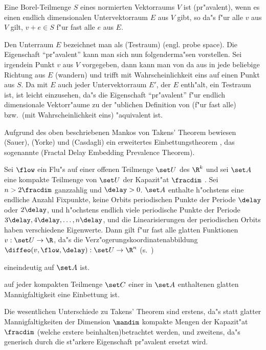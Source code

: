 \begin{definition}[Pr"avalent]
Eine Borel-Teilmenge $S$ eines normierten Vektorraums $V$ ist \begriff(pr"avalent), wenn
es einen endlich dimensionalen Untervektorraum $E$ aus $V$ gibt, so da"s f"ur alle $v$ aus
$V$ gilt, $v+e\in S$ f"ur fast alle $e$ aus $E$.
\end{definition}
Den Unterraum $E$ bezeichnet man als \begriff(Testraum) (engl. probe space). Die
Eigenschaft ``pr"avalent'' kann man sich nun folgenderma"sen vorstellen. Sei irgendein
Punkt $v$ aus $V$ vorgegeben, dann kann man von da aus in jede beliebige Richtung aus $E$
\naja(wandern) und trifft mit Wahrscheinlichkeit eins auf einen Punkt aus $S$. Da mit $E$
auch jeder Untervektorraum $E'$, der $E$ enth"alt, ein Testraum ist, ist leicht
einzusehen, da"s die Eigenschaft ``pr"avalent'' f"ur endlich dimensionale Vektorr"aume zu
der "ublichen Definition von \naja(f"ur fast alle) bzw.\ \naja(mit Wahrscheinlichkeit
eins) "aquivalent ist.


Aufgrund des oben beschriebenen Mankos von Takens' Theorem bewiesen \autor(Sauer),
\autor(Yorke) und \autor(Casdagli) ein erweitertes Einbettungstheorem \cite{Sauer91}, das
sogenannte \begriff(Fractal Delay Embedding Prevalence Theorem).

\begin{theorem}
Sei $\flow$ ein Flu"s auf einer offenen Teilmenge $\set U$ des $\R^k$ und sei $\set A$
eine kompakte Teilmenge von $\set U$ der Kapazit"at $\fracdim$ . Sei $n>2\fracdim$ ganzzahlig und $\delay>0$. $\set A$ enthalte h"ochstens
eine endliche Anzahl Fixpunkte, keine Orbits periodischen Punkte der Periode $\delay$ 
oder $2\delay$, und h"ochstens endlich viele periodische Punkte der Periode $3\delay,4\delay,\dots,n\delay$,
und die Linearisierungen der periodischen Orbits haben verschiedene Eigenwerte. Dann gilt
f"ur fast alle glatten Funktionen $v:\set U\to\R$, da"s die
Verz"ogerungskoordinatenabbildung $\diffeo(v,\flow,\delay):\set U\to\R^n$ (s.~)
\begin{myitemize}
\item eineindeutig auf $\set A$ ist.
\item auf jeder kompakten Teilmenge $\set C$ einer in $\set A$ enthaltenen 
  glatten Mannigfaltigkeit eine Einbettung ist.
\end{myitemize}
\end{theorem}

Die wesentlichen Unterschiede zu Takens' Theorem sind erstens, da"s statt glatter
Mannigfaltigkeiten der Dimension $\mandim$ kompakte Mengen der Kapazit"at $\fracdim$
(welche erstere beinhalten)betrachtet werden, und zweitens, da"s generisch durch die
st"arkere Eigenschaft pr"avalent ersetzt wird.

